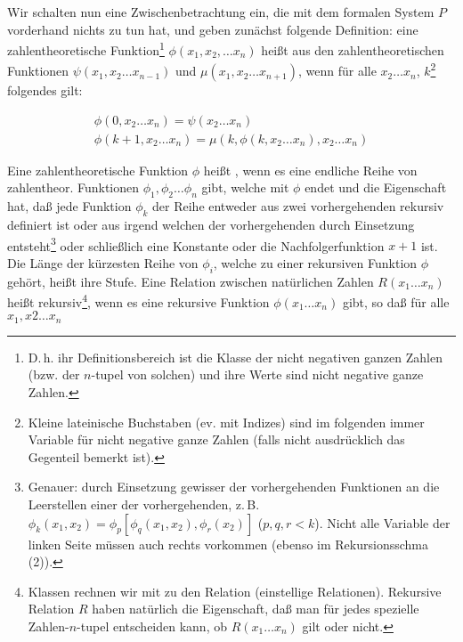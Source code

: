\documentclass[draft]{scrartcl}
\begin{document}
Wir schalten nun eine Zwischenbetrachtung ein, die mit dem
formalen System $P$ vorderhand nichts zu tun hat, und
geben zunächst folgende Definition: eine zahlentheoretische
Funktion\footnote{D.\,h. ihr Definitionsbereich ist die 
Klasse der nicht negativen ganzen Zahlen (bzw. der $n$-tupel 
von solchen) und ihre Werte sind nicht negative ganze Zahlen.}
$\phi\left(x_1, x_2, \dots x_n\right)$ heißt 
aus den zahlentheoretischen Funktionen 
$\psi\left(x_1, x_2 \dots x_{n - 1}\right)$ und $\mu\left(x_1, x_2 \dots x_{n + 1}\right)$, wenn
für alle $x_2 \dots x_n$, $k$\footnote{Kleine lateinische Buchstaben (ev. 
mit Indizes) sind im folgenden immer Variable für nicht negative 
ganze Zahlen (falls nicht ausdrücklich das Gegenteil bemerkt ist).}
folgendes gilt:

\begin{equation}
	\begin{aligned}
		\phi\left(0, x_2 \dots x_n\right) =  \psi\left(x_2 \dots x_n\right)\\
		\phi\left(k + 1, x_2 \dots x_n\right) = \mu\left(k, \phi\left(k, x_2 \dots x_n\right), x_2 \dots x_n\right)
	\end{aligned}
\end{equation}

Eine zahlentheoretische Funktion $\phi$ heißt 
, wenn es eine endliche Reihe von zahlentheor.
Funktionen $\phi_1, \phi_2 \dots \phi_n$ gibt, welche
mit $\phi$ endet und die Eigenschaft hat, daß jede
Funktion $\phi_k$ der Reihe entweder aus zwei
vorhergehenden rekursiv definiert ist oder aus irgend
welchen der vorhergehenden durch Einsetzung 
entsteht\footnote{Genauer: durch Einsetzung gewisser der vorhergehenden 
Funktionen an die Leerstellen einer der vorhergehenden, z.\,B. $\phi_k\left(x_1, x_2\right) = \phi_p\left[\phi_q\left(x_1, x_2\right), \phi_r\left(x_2\right)\right]$ ($p, q, r < k$). Nicht alle Variable der linken Seite müssen auch rechts vorkommen (ebenso im Rekursionsschma (2)).}
oder schließlich eine Konstante oder die Nachfolgerfunktion
$x + 1$ ist. Die Länge der kürzesten Reihe von $\phi_i$,
welche zu einer rekursiven Funktion $\phi$ gehört,
heißt ihre Stufe. Eine Relation zwischen natürlichen
Zahlen $R\left(x_1 \dots x_n\right)$ heißt 
rekursiv\footnote{Klassen rechnen wir mit zu den 
Relation (einstellige Relationen). Rekursive Relation 
$R$ haben natürlich die Eigenschaft, daß man für 
jedes spezielle Zahlen-$n$-tupel entscheiden kann, 
ob $R\left(x_1 \dots x_n\right)$ gilt oder nicht.},
wenn es eine rekursive Funktion $\phi\left(x_1 \dots x_n\right)$ gibt,
so daß für alle $x_1, x2 \dots x_n$ 
\end{document}
